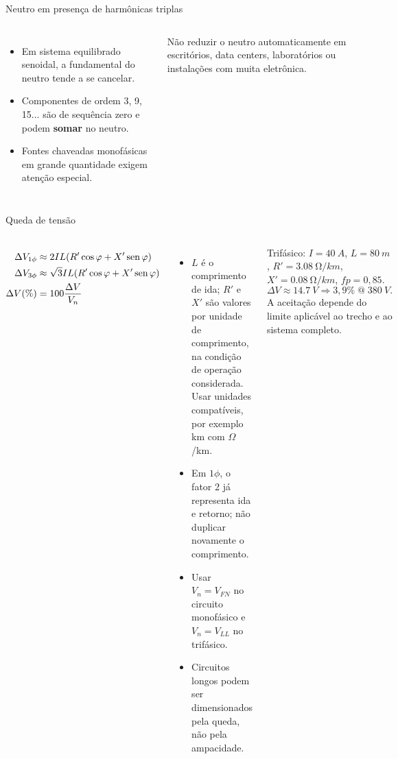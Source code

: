 \begin{frame}{Neutro em presença de harmônicas triplas}
\small
\begin{columns}[T,onlytextwidth]
\begin{itemize}
\item Em sistema equilibrado senoidal, a fundamental do neutro tende a se cancelar.
\item Componentes de ordem 3, 9, 15... são de sequência zero e podem \textbf{somar} no neutro.
\item Fontes chaveadas monofásicas em grande quantidade exigem atenção especial.
\end{itemize}
\begin{caixaAt}
Não reduzir o neutro automaticamente em escritórios, data centers, laboratórios ou instalações com muita eletrônica.
\end{caixaAt}
\end{columns}
\end{frame}

\begin{frame}[shrink=5]{Queda de tensão}
\small
\begin{columns}[T,onlytextwidth]
\begin{align*}
\Delta V_{1\phi}&\approx2IL(R'\cos\varphi+X'\operatorname{sen}\varphi)\\
\Delta V_{3\phi}&\approx\sqrt3IL(R'\cos\varphi+X'\operatorname{sen}\varphi)\\
\Delta V(\%)&=100\frac{\Delta V}{V_n}
\end{align*}
\begin{itemize}
\item $L$ é o comprimento de ida; $R'$ e $X'$ são valores por unidade de comprimento, na condição de operação considerada. Usar unidades compatíveis, por exemplo km com $\Omega$/km.
\item Em $1\phi$, o fator 2 já representa ida e retorno; não duplicar novamente o comprimento.
\item Usar $V_n=V_{FN}$ no circuito monofásico e $V_n=V_{LL}$ no trifásico.
\item Circuitos longos podem ser dimensionados pela queda, não pela ampacidade.
\end{itemize}
\begin{caixaEx}
Trifásico: $I=\SI{40}{A}$, $L=\SI{80}{m}$, $R'=\SI{3.08}{\ohm/km}$, $X'=\SI{0.08}{\ohm/km}$, $fp=0{,}85$.
\[
\Delta V\approx\SI{14.7}{V}\Rightarrow 3{,}9\%\;@\;\SI{380}{V}.
\]
A aceitação depende do limite aplicável ao trecho e ao sistema completo.
\end{caixaEx}
\end{columns}
\end{frame}

